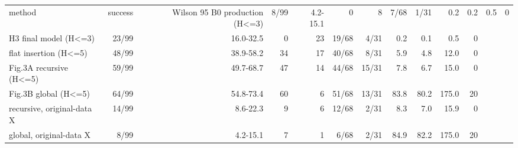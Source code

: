 \begin{tabular}{lrrrrrrrrrr}
\toprule
method & success & Wilson 95%
\midrule
B0 production (H<=3) & 8/99 & 4.2-15.1 & 0 & 8 & 7/68 & 1/31 & 0.2 & 0.2 & 0.5 & 0 \\
H3 final model (H<=3) & 23/99 & 16.0-32.5 & 0 & 23 & 19/68 & 4/31 & 0.2 & 0.1 & 0.5 & 0 \\
flat insertion (H<=5) & 48/99 & 38.9-58.2 & 34 & 17 & 40/68 & 8/31 & 5.9 & 4.8 & 12.0 & 0 \\
Fig.3A recursive (H<=5) & 59/99 & 49.7-68.7 & 47 & 14 & 44/68 & 15/31 & 7.8 & 6.7 & 15.0 & 0 \\
Fig.3B global (H<=5) & 64/99 & 54.8-73.4 & 60 & 6 & 51/68 & 13/31 & 83.8 & 80.2 & 175.0 & 20 \\
recursive, original-data X & 14/99 & 8.6-22.3 & 9 & 6 & 12/68 & 2/31 & 8.3 & 7.0 & 15.9 & 0 \\
global, original-data X & 8/99 & 4.2-15.1 & 7 & 1 & 6/68 & 2/31 & 84.9 & 82.2 & 175.0 & 20 \\
\bottomrule
\end{tabular}
